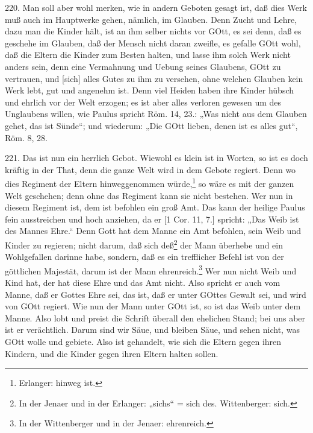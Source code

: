 220. Man soll aber wohl merken, wie in andern Geboten gesagt ist, daß dies Werk muß auch im Hauptwerke gehen, nämlich, im Glauben. Denn Zucht und Lehre, dazu man die Kinder hält, ist an ihm selber nichts vor GOtt, es sei denn, daß es geschehe im Glauben, daß der Mensch nicht daran zweifle, es gefalle GOtt wohl, daß die Eltern die Kinder zum Besten halten, und lasse ihm solch Werk nicht anders sein, denn eine Vermahnung und Uebung seines Glaubens, GOtt zu vertrauen, und [sich] alles
Gutes zu ihm zu versehen, ohne welchen Glauben kein Werk lebt, gut und angenehm ist. Denn viel Heiden haben ihre Kinder hübsch und ehrlich vor der Welt erzogen; es ist aber alles verloren gewesen um des Unglaubens willen, wie Paulus spricht Röm. 14, 23.: „Was nicht aus dem Glauben gehet, das ist Sünde“; und wiederum: „Die GOtt lieben, denen ist es alles gut“, Röm. 8, 28.

221. Das ist nun ein herrlich Gebot. Wiewohl es klein ist in Worten, so ist es doch kräftig in der That, denn die ganze Welt wird in dem Gebote regiert. Denn wo dies Regiment der Eltern hinweggenommen würde,\footnote{Erlanger: hinweg ist.} so wäre es mit der ganzen Welt geschehen; denn ohne das Regiment kann sie nicht bestehen. Wer nun in diesem Regiment ist, dem ist befohlen ein groß Amt. Das kann der heilige Paulus fein ausstreichen und hoch anziehen, da er [1 Cor. 11, 7.] spricht: „Das Weib ist des Mannes Ehre.“ Denn Gott hat dem Manne ein Amt befohlen, sein Weib und Kinder zu regieren; nicht darum, daß sich deß\footnote{In der Jenaer und in der Erlanger: „sichs“ = sich des. Wittenberger: sich.} der Mann überhebe und ein Wohlgefallen darinne habe, sondern, daß es ein trefflicher Befehl ist von der göttlichen Majestät, darum ist der Mann ehrenreich.\footnote{In der Wittenberger und in der Jenaer: ehrenreich.} Wer nun nicht Weib und Kind hat, der hat diese Ehre und das Amt nicht. Also spricht er auch vom Manne, daß er Gottes Ehre sei, das ist, daß er unter GOttes Gewalt sei, und wird von GOtt regiert. Wie nun der Mann unter GOtt ist, so ist das Weib unter dem Manne. Also lobt und preist die Schrift überall den ehelichen Stand; bei uns aber ist er verächtlich. Darum sind wir Säue, und bleiben Säue, und sehen nicht, was GOtt wolle und gebiete. Also ist gehandelt, wie sich die Eltern gegen ihren Kindern, und die Kinder gegen ihren Eltern halten sollen.

